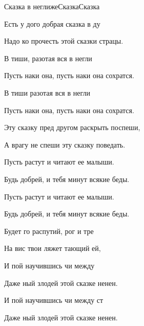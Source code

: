 \documentclass[11pt,a5paper]{book}
\renewcommand{\footrulewidth}{0.0pt}
\renewcommand{\footrulewidth}{0pt}
\renewcommand{\footrulewidth}{0.0pt}
\begin{document}
\begin{song}{Сказка в неглиже}{}{Сказка}{Сказка}{}{}
\begin{SBVerse*}
Есть у дого добрая сказка в ду\par 
Надо ко прочесть этой сказки страцы.\par
В тиши, разотая вся в негли\par
Пусть наки она, пусть наки она сохратся. \par 
В тиши разотая вся в негли \par
Пусть наки она, пусть наки она сохратся.
\end{SBVerse*}

Эту сказку пред другом раскрыть поспеши,\par
А врагу не спеши эту сказку поведать.\par
Пусть растут и читают ее малыши.\par
Будь добрей, и тебя минут всякие беды.\par
Пусть растут и читают ее малыши.\par
Будь добрей, и тебя минут всякие беды.

\begin{SBVerse*}
Будет го распутий, рог и тре\par
На вис твои ляжет тающий ей, \par
И пой научившись чи между  \par
Даже ный злодей  этой сказке ненен. \par
И пой научившись чи между ст \par
Даже ный злодей  этой сказке ненен.
\end{SBVerse*}
     \par
{}    
\end{song}


\renewcommand{\footrulewidth}{0.0pt}
\renewcommand{\item}{\par\hangindent=40pt}
\renewcommand{\subitem}{\par\hangindent=40pt \hspace*{20pt}}
\renewcommand{\subsubitem}{\par\hangindent=40pt \hspace*{30pt}}
\end{document}
